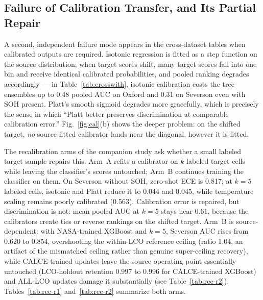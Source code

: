 \subsection{Failure of Calibration Transfer, and Its Partial Repair}
A second, independent failure mode appears in the cross-dataset tables when calibrated outputs are required. Isotonic regression is fitted as a step function on the source distribution; when target scores shift, many target scores fall into one bin and receive identical calibrated probabilities, and pooled ranking degrades accordingly --- in Table~\ref{tab:crosswith}, isotonic calibration costs the tree ensembles up to 0.48 pooled AUC on Oxford and 0.31 on Severson even with SOH present. Platt's smooth sigmoid degrades more gracefully, which is precisely the sense in which ``Platt better preserves discrimination at comparable calibration error.'' Fig.~\ref{fig:cal}(b) shows the deeper problem: on the shifted target, \emph{no} source-fitted calibrator lands near the diagonal, however it is fitted.

The recalibration arms of the companion study \cite{shikdar2026robustness} ask whether a small labeled target sample repairs this. Arm~A refits a calibrator on $k$ labeled target cells while leaving the classifier's scores untouched; Arm~B continues training the classifier on them. On Severson without SOH, zero-shot ECE is 0.817; at $k{=}5$ labeled cells, isotonic and Platt reduce it to 0.044 and 0.045, while temperature scaling remains poorly calibrated (0.563). Calibration error is repaired, but discrimination is not: mean pooled AUC at $k{=}5$ stays near 0.61, because the calibrators create ties or reverse rankings on the shifted target. Arm~B is source-dependent: with NASA-trained XGBoost and $k{=}5$, Severson AUC rises from 0.620 to 0.854, overshooting the within-LCO reference ceiling (ratio 1.04, an artifact of the mismatched ceiling rather than genuine super-ceiling recovery), while CALCE-trained updates leave the source operating point essentially untouched (LCO-holdout retention 0.997 to 0.996 for CALCE-trained XGBoost) and ALL-LCO updates damage it substantially (see Table~\ref{tab:rec-r2}). Tables~\ref{tab:rec-r1} and~\ref{tab:rec-r2} summarize both arms.

